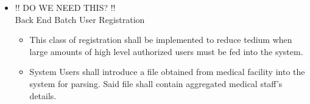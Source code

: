 \begin{itemize}
\begin{itemize}
		\item{!! DO WE NEED THIS? !!\\Back End Batch User Registration}
		\begin{itemize}
			\item This class of registration shall be implemented to reduce tedium when large amounts of high level authorized users must be fed into the system.
			\item System Users shall introduce a file obtained from medical facility into the system for parsing. Said file shall contain aggregated medical staff's details.
		\end{itemize}
	\end{itemize}
\end{itemize}